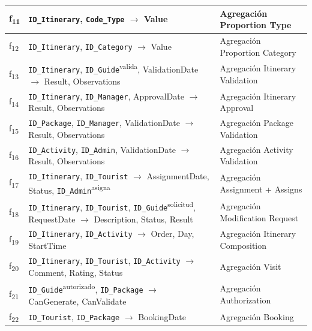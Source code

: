 \documentclass[11pt,a4paper]{article}
\begin{document}
{\begin{longtable}{|>{\raggedright\arraybackslash}p{0.78cm}|>{\raggedright\arraybackslash}p{9.68cm}|>{\raggedright\arraybackslash}p{4.88cm}|}
f\textsubscript{11} & \texttt{ID\_Itinerary}, \texttt{Code\_Type} \ensuremath{\rightarrow} Value & Agregación Proportion Type \\ \hline
f\textsubscript{12} & \texttt{ID\_Itinerary}, \texttt{ID\_Category} \ensuremath{\rightarrow} Value & Agregación Proportion Category \\ \hline
f\textsubscript{13} & \texttt{ID\_Itinerary}, \texttt{ID\_Guide}\textsuperscript{valida}, ValidationDate \ensuremath{\rightarrow} Result, Observations & Agregación Itinerary Validation \\ \hline
f\textsubscript{14} & \texttt{ID\_Itinerary}, \texttt{ID\_Manager}, ApprovalDate \ensuremath{\rightarrow} Result, Observations & Agregación Itinerary Approval \\ \hline
f\textsubscript{15} & \texttt{ID\_Package}, \texttt{ID\_Manager}, ValidationDate \ensuremath{\rightarrow} Result, Observations & Agregación Package Validation \\ \hline
f\textsubscript{16} & \texttt{ID\_Activity}, \texttt{ID\_Admin}, ValidationDate \ensuremath{\rightarrow} Result, Observations & Agregación Activity Validation \\ \hline
f\textsubscript{17} & \texttt{ID\_Itinerary}, \texttt{ID\_Tourist} \ensuremath{\rightarrow} AssignmentDate, Status, \texttt{ID\_Admin}\textsuperscript{asigna} & Agregación Assignment + Assigns \\ \hline
f\textsubscript{18} & \texttt{ID\_Itinerary}, \texttt{ID\_Tourist}, \texttt{ID\_Guide}\textsuperscript{solicitud}, RequestDate \ensuremath{\rightarrow} Description, Status, Result & Agregación Modification Request \\ \hline
f\textsubscript{19} & \texttt{ID\_Itinerary}, \texttt{ID\_Activity} \ensuremath{\rightarrow} Order, Day, StartTime & Agregación Itinerary Composition \\ \hline
f\textsubscript{20} & \texttt{ID\_Itinerary}, \texttt{ID\_Tourist}, \texttt{ID\_Activity} \ensuremath{\rightarrow} Comment, Rating, Status & Agregación Visit \\ \hline
f\textsubscript{21} & \texttt{ID\_Guide}\textsuperscript{autorizado}, \texttt{ID\_Package} \ensuremath{\rightarrow} CanGenerate, CanValidate & Agregación Authorization \\ \hline
f\textsubscript{22} & \texttt{ID\_Tourist}, \texttt{ID\_Package} \ensuremath{\rightarrow} BookingDate & Agregación Booking \\ \hline
\end{longtable}}
\vspace{2pt}
\end{document}
